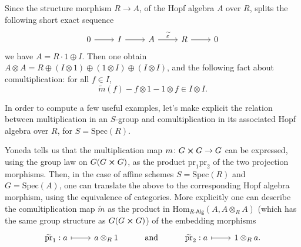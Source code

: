 \documentclass[../Main]{subfiles}
\begin{document}
\begin{defn}
	Since the structure morphism $R \to A$, of the Hopf algebra $A$ over $R$,
	splits the following short exact sequence
	\begin{equation*}
	\begin{tikzcd}
		0 \arrow[r, "", rightarrow] &
		I \arrow[r, "", rightarrow] &
		A \arrow[r, "\widetilde{\varepsilon}", rightarrow] &
		R \arrow[r, "", rightarrow] &
		0
	\end{tikzcd}
	\end{equation*}
	we have $A = R \cdot 1 \oplus I$.
	Then one obtain $A \otimes A = R \oplus \left( I \otimes 1 \right) \oplus
	\left( 1 \otimes I \right) \oplus \left( I \otimes I \right)$,
	and the following fact about comultiplication:
	for all $f \in I$,
	\begin{equation*}
		\widetilde{m}(f) - f \otimes 1 - 1 \otimes f \in I \otimes I
	.\end{equation*} 
\end{defn}


In order to compute a few useful examples, let's make explicit the relation between
multiplication in an $S$-group and comultiplication in its associated Hopf algebra over
$R$, for $S = \mathrm{Spec}(R)$.
\begin{rem}\label{rem:ExplicitComult}
	Yoneda tells us that the multiplication map 
	$m\colon G \cross G \to G$ can be expressed, using the group law
	on $G(G \cross G)$, as the product $\mathrm{pr}_1 \mathrm{pr}_2$
	of the two projection morphisms.
	Then, in the case of affine schemes $S = \mathrm{Spec}(R)$
	and $G = \mathrm{Spec}(A)$, one can translate the above to the corresponding
	Hopf algebra morphism, using the equivalence of categories.
	More explicitly one can describe the comultiplication map
	$\widetilde{m}$ as the product in 
	$\mathrm{Hom}_{R\text{-}\mathsf{Alg}} \left( A, A \otimes_R A \right)$ 
	(which has the same group structure as $G(G \cross G)$)
	of the embedding morphisms
	\begin{equation*}
	\begin{tikzcd}
		\widetilde{\mathrm{pr}}_1: a \arrow[r, "", mapsto] &
		a \otimes_R 1 &
		\text{and} &
		\widetilde{\mathrm{pr}}_2: a \arrow[r, "", mapsto] &
		1 \otimes_R a
	.\end{tikzcd}
	\end{equation*}
\end{rem}
\end{document}
